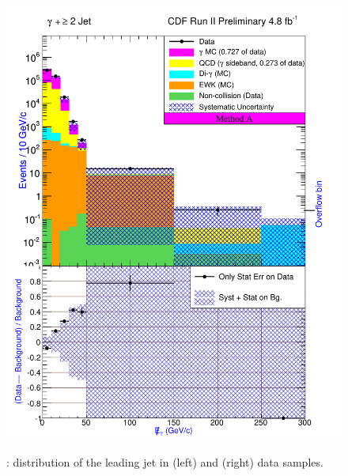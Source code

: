 \documentclass[11pt]{article}
\begin{document}
\begin{figure}[h!]
{ \includegraphics[scale=\resultsHistScale,keepaspectratio=true]{./g30jet_MtdA_plot2_Met.pdf}
}
 \caption{: \met distribution of the leading jet in \phoonejet (left) and \photwojet (right) data samples.}
 \label{fig:Result_MtdA_gj1_Met}
\end{figure}
\end{document}
